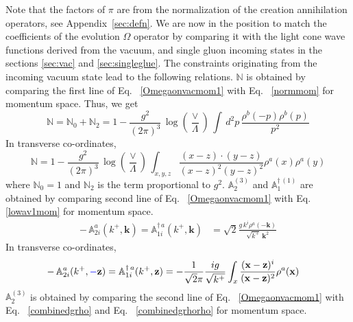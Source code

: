 \documentclass[10pt]{article}
\def\mf#1{\mathbb{#1}}
\numberwithin{equation}{section}
\begin{document}
Note that the factors of $\pi$ are from the normalization of the creation annihilation operators, see Appendix~\ref{sec:defn}. We are now in the position to match the coefficients of the evolution $\Omega$ operator by comparing it with the light cone wave functions derived from the vacuum, and single gluon incoming states in the sections \ref{sec:vac} and \ref{sec:singleglue}. The constraints originating from the incoming vacuum state lead to the following relations. $\mf{N}$ is obtained by comparing the first line of Eq.~ \eqref{Omegaonvacmom1} with Eq.~ \eqref{normmom} for momentum space. Thus, we get
\begin{equation}\label{Ncoeffmom}
    \mf{N} =  \mf{N}_0 +  \mf{N}_2 = 1- \frac{g^{2}}{(2\pi)^{3}}\, \log{\left(\frac{\vee}{\Lambda}\right)}\,\int\, d^{2}p\,\frac{\rho^{b}(-p)\rho^{b}(p)}{p^{2}}
\end{equation}
In transverse co-ordinates,
\begin{equation}\label{eq:Ncoeffpos}
    \mf{N}  = 1 -
    \frac{g^{2}}{(2\pi)^{3}}\, \log{\left(\frac{\vee}{\Lambda}\right)}\, \int_{x,y,z}\frac{(x-z)\cdot (y-z)}{(x-z)^{2}(y-z)^{2}}\rho^{a}(x)\rho^{a}(y)
\end{equation}
where  $ \mf{N}_0=1$ and  $\mf{N}_2$ is the term proportional to $g^2$. $\mf{A}^{(3)}_{2}$ and $\mf{A}^{\dagger\, (1)}_{1}$ are obtained by comparing second line of Eq.~ \eqref{Omegaonvacmom1} with Eq.~ \eqref{lowav1mom} for momentum space. 
\begin{align}
\label{A1coeffM}
  -\,\mf{A}^{a}_{2i}(k^{+},\mathbf{k}) =  \mf{A}^{\dagger\,a}_{ 1 i}(k^{+},\mathbf{k}) & = \sqrt{2} \frac{g\,k^{i}\rho^{a}(-\mathbf{k})}{ \sqrt{k^{+}}\,\mathbf{k}^{2}} 
\end{align}
In transverse co-ordinates,
\begin{align}
\label{A1coeff}
  -\, \mf{A}^{a}_{2i}(k^{+},\textcolor{blue}{-}\mathbf{z}) =   \mf{A}^{\dagger\,a}_{1 i}(k^{+},\mathbf{z}) & = - \frac{1}{\sqrt{2}\pi}\frac{ig}{\sqrt{k^+}}\int_{x}\frac{(\mathbf{x}-\mathbf{z})^{i}}{(\mathbf{x}-\mathbf{z})^{2}} \rho^{a}(\mathbf{x}) 
\end{align}
$ \mf{A}^{(3)}_{2}$ is obtained by comparing the second line of Eq.~ \eqref{Omegaonvacmom1} with Eq.~ \eqref{combinedgrho} and Eq.~ \eqref{combinedgrhorho} for momentum space. 
\end{document}
